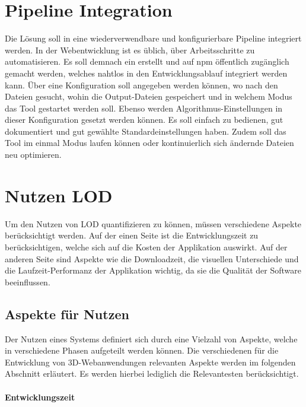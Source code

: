 \section{Pipeline Integration}
Die Lösung soll in eine wiederverwendbare und konfigurierbare Pipeline integriert werden.
In der Webentwicklung ist es üblich, über  Arbeitsschritte zu automatisieren. Es soll demnach ein  erstellt und auf \gls{npm} öffentlich zugänglich gemacht werden, welches nahtlos in den Entwicklungsablauf integriert werden kann. Über eine Konfiguration soll angegeben werden können, wo nach den  Dateien gesucht, wohin die Output-Dateien gespeichert und in welchem Modus das Tool gestartet werden soll. Ebenso werden Algorithmus-Einstellungen in dieser Konfiguration gesetzt werden können. Es soll einfach zu bedienen, gut dokumentiert und gut gewählte Standardeinstellungen haben. Zudem soll das Tool im einmal Modus laufen können oder kontinuierlich sich ändernde Dateien neu optimieren.

\section{Nutzen LOD}
Um den Nutzen von LOD quantifizieren zu können, müssen verschiedene Aspekte berücksichtigt werden. Auf der einen Seite ist die Entwicklungszeit zu berücksichtigen, welche sich auf die Kosten der Applikation auswirkt. Auf der anderen Seite sind Aspekte wie die Downloadzeit, die visuellen Unterschiede und die Laufzeit-Performanz der Applikation wichtig, da sie die Qualität der Software beeinflussen.

\subsection{Aspekte für Nutzen}

Der Nutzen eines Systems definiert sich durch eine Vielzahl von Aspekte, welche in verschiedene Phasen aufgeteilt werden können. Die verschiedenen für die Entwicklung von 3D-Webanwendungen relevanten Aspekte werden im folgenden Abschnitt erläutert. Es werden hierbei lediglich die Relevantesten berücksichtigt.

\paragraph{Entwicklungszeit}

